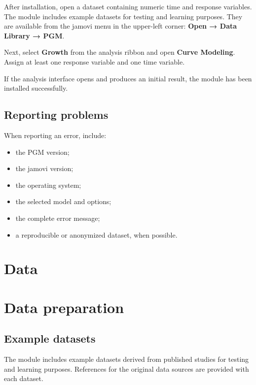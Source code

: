 \documentclass[
  english,
  letterpaper,
  DIV=11,
  numbers=noendperiod]{scrreprt}
\begin{document}
After installation, open a dataset containing numeric time and response
variables. The module includes example datasets for testing and learning
purposes. They are available from the jamovi menu in the upper-left
corner: \textbf{Open → Data Library → PGM}.

Next, select \textbf{Growth} from the analysis ribbon and open
\textbf{Curve Modeling}. Assign at least one response variable and one
time variable.

If the analysis interface opens and produces an initial result, the
module has been installed successfully.

\section{Reporting problems}\label{reporting-problems}

When reporting an error, include:

\begin{itemize}
\item
  the PGM version;
\item
  the jamovi version;
\item
  the operating system;
\item
  the selected model and options;
\item
  the complete error message;
\item
  a reproducible or anonymized dataset, when possible.
\end{itemize}


\chapter{Data}\label{data}


\chapter{Data preparation}\label{data-preparation}

\section{Example datasets}\label{example-datasets}

The module includes example datasets derived from published studies for
testing and learning purposes. References for the original data sources
are provided with each dataset.
\end{document}
